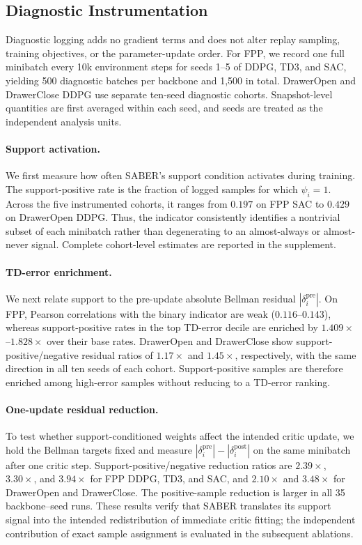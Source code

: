 \documentclass[letterpaper]{article}
\begin{document}
\subsection{Diagnostic Instrumentation}

Diagnostic logging adds no gradient terms and does not alter replay sampling, training objectives, or the parameter-update order. For FPP, we record one full minibatch every 10k environment steps for seeds 1--5 of DDPG, TD3, and SAC, yielding 500 diagnostic batches per backbone and 1,500 in total. DrawerOpen and DrawerClose DDPG use separate ten-seed diagnostic cohorts. Snapshot-level quantities are first averaged within each seed, and seeds are treated as the independent analysis units.

\paragraph{Support activation.}
We first measure how often SABER's support condition activates during training. The support-positive rate is the fraction of logged samples for which \(\psi_i=1\). Across the five instrumented cohorts, it ranges from \(0.197\) on FPP SAC to \(0.429\) on DrawerOpen DDPG. Thus, the indicator consistently identifies a nontrivial subset of each minibatch rather than degenerating to an almost-always or almost-never signal. Complete cohort-level estimates are reported in the supplement.

\paragraph{TD-error enrichment.}
We next relate support to the pre-update absolute Bellman residual \(|\delta_i^{\mathrm{pre}}|\). On FPP, Pearson correlations with the binary indicator are weak (\(0.116\)--\(0.143\)), whereas support-positive rates in the top TD-error decile are enriched by \(1.409\times\)--\(1.828\times\) over their base rates. DrawerOpen and DrawerClose show support-positive/negative residual ratios of \(1.17\times\) and \(1.45\times\), respectively, with the same direction in all ten seeds of each cohort. Support-positive samples are therefore enriched among high-error samples without reducing to a TD-error ranking.

\paragraph{One-update residual reduction.}
To test whether support-conditioned weights affect the intended critic update, we hold the Bellman targets fixed and measure \(|\delta_i^{\mathrm{pre}}|-|\delta_i^{\mathrm{post}}|\) on the same minibatch after one critic step. Support-positive/negative reduction ratios are \(2.39\times\), \(3.30\times\), and \(3.94\times\) for FPP DDPG, TD3, and SAC, and \(2.10\times\) and \(3.48\times\) for DrawerOpen and DrawerClose. The positive-sample reduction is larger in all 35 backbone--seed runs. These results verify that SABER translates its support signal into the intended redistribution of immediate critic fitting; the independent contribution of exact sample assignment is evaluated in the subsequent ablations.
\end{document}
